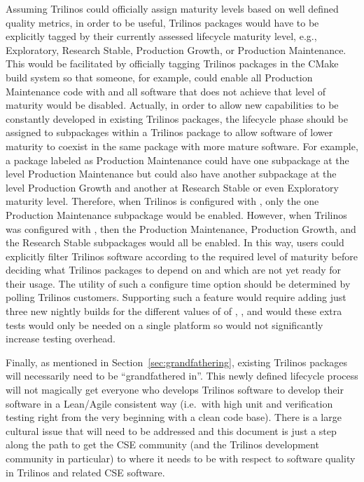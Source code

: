 \documentclass[11pt]{SANDreport}
\begin{document}
Assuming Trilinos could officially assign maturity levels based on
well defined quality metrics, in order to be useful, Trilinos packages
would have to be explicitly tagged by their currently assessed
lifecycle maturity level, e.g., Exploratory, Research Stable,
Production Growth, or Production Maintenance.  This would be
facilitated by officially tagging Trilinos packages in the CMake build
system so that someone, for example, could enable all Production
Maintenance code with
{} and all software that does not achieve that
level of maturity would be disabled.  Actually, in order to allow new
capabilities to be constantly developed in existing Trilinos packages,
the lifecycle phase should be assigned to subpackages within a
Trilinos package to allow software of lower maturity to coexist in the
same package with more mature software.  For example, a package
labeled as Production Maintenance could have one subpackage at the
level Production Maintenance but could also have another subpackage at
the level Production Growth and another at Research Stable or even
Exploratory maturity level.  Therefore, when Trilinos is configured
with {}, only the one Production Maintenance
subpackage would be enabled.  However, when Trilinos was configured
with {}, then the Production Maintenance, Production Growth,
and the Research Stable subpackages would all be enabled.  In this
way, users could explicitly filter Trilinos software according to the
required level of maturity before deciding what Trilinos packages to
depend on and which are not yet ready for their usage.  The utility of
such a configure time option should be determined by polling Trilinos
customers.  Supporting such a feature would require adding just three
new nightly builds for the different values of
{} of
{}, {}, and
{} would these extra tests would only be
needed on a single platform so would not significantly increase
testing overhead.

Finally, as mentioned in Section~\ref{sec:grandfathering}, existing
Trilinos packages will necessarily need to be ``grandfathered in''.
This newly defined lifecycle process will not magically get everyone
who develops Trilinos software to develop their software in a
Lean/Agile consistent way (i.e.\ with high unit and verification
testing right from the very beginning with a clean code base).  There
is a large cultural issue that will need to be addressed and this
document is just a step along the path to get the CSE community (and
the Trilinos development community in particular) to where it needs to
be with respect to software quality in Trilinos and related CSE
software.
\end{document}
